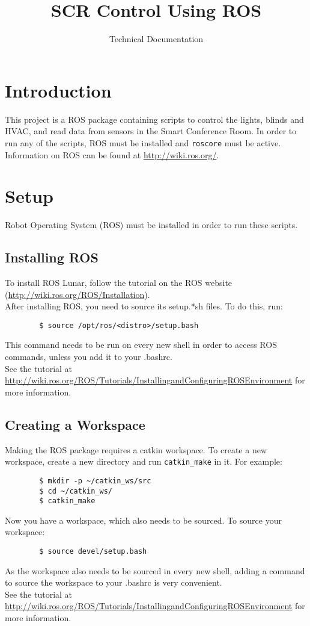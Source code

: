 \documentclass[twoside]{article}
\title{SCR Control Using ROS}
\author{Technical Documentation}
\date{ }
\begin{document}
	\maketitle
	
	\tableofcontents
	\newpage
	
	\section{Introduction}
	This project is a ROS package containing scripts to control the lights, blinds and HVAC, and read data from sensors in the Smart Conference Room. In order to run any of the scripts, ROS must be installed and \verb|roscore| must be active. Information on ROS can be found at \url{http://wiki.ros.org/}.
	\section{Setup}
	Robot Operating System (ROS) must be installed in order to run these scripts.
	\subsection{Installing ROS}
	To install ROS Lunar, follow the tutorial on the ROS website (\url{http://wiki.ros.org/ROS/Installation}).\\
	After installing ROS, you need to source its setup.*sh files. To do this, run:
	\begin{verbatim}
	    $ source /opt/ros/<distro>/setup.bash
	\end{verbatim}
	This command needs to be run on every new shell in order to access ROS commands, unless you add it to your .bashrc.\\
	See the tutorial at \url{http://wiki.ros.org/ROS/Tutorials/InstallingandConfiguringROSEnvironment} for more information.
	
	\subsection{Creating a Workspace}
	Making the ROS package requires a catkin workspace. To create a new workspace, create a new directory and run \verb|catkin_make| in it. For example:
	\begin{verbatim}
	    $ mkdir -p ~/catkin_ws/src
	    $ cd ~/catkin_ws/
	    $ catkin_make
	\end{verbatim}
	Now you have a workspace, which also needs to be sourced. To source your workspace:
	\begin{verbatim}
	    $ source devel/setup.bash
	\end{verbatim}
	As the workspace also needs to be sourced in every new shell, adding a command to source the workspace to your .bashrc is very convenient.\\
	See the tutorial at \url{http://wiki.ros.org/ROS/Tutorials/InstallingandConfiguringROSEnvironment} for more information.
	
\end{document}
